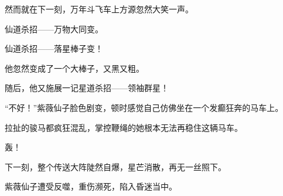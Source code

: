 \begin{this_body}
然而就在下一刻，万年斗飞车上方源忽然大笑一声。

仙道杀招——万物大同变。

仙道杀招——落星棒子变！

他忽然变成了一个大棒子，又黑又粗。

随后，他又施展一记星道杀招——领袖群星！

“不好！”紫薇仙子脸色剧变，顿时感觉自己仿佛坐在一个发癫狂奔的马车上。

拉扯的骏马都疯狂混乱，掌控鞭绳的她根本无法再稳住这辆马车。

轰！

下一刻，整个传送大阵陡然自爆，星芒消散，再无一丝照下。

紫薇仙子遭受反噬，重伤濒死，陷入昏迷当中。

\end{this_body}


